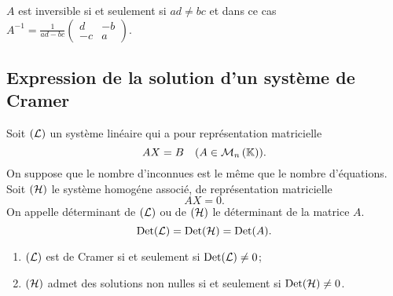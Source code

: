 \(A\) est inversible si et seulement si \(ad \neq bc\) et dans ce cas \(A^{-1} = \frac{1}{ad-bc} \begin{pmatrix} d & -b \\ -c & a \end{pmatrix}\).

\subsection{Expression de la solution d'un système de Cramer}

Soit \((\mathcal{L})\) un système linéaire qui a pour représentation matricielle
\begin{equation}
  AX=B \quad (A \in \mathcal{M}_{n}\left(\mathbb{K}\right)).
\end{equation}
On suppose que le nombre d'inconnues est le même que le nombre d'équations. Soit \((\mathcal{H})\) le système homogéne associé, de représentation matricielle
\begin{equation}
  AX=0.
\end{equation}
On appelle déterminant de \((\mathcal{L})\) ou de \((\mathcal{H})\) le déterminant de la matrice \(A\).
\begin{equation}
  \operatorname{Det}(\mathcal{L})=\operatorname{Det}(\mathcal{H})=\operatorname{Det}(A).
\end{equation}

\begin{prop}
  \begin{enumerate}
  \item \((\mathcal{L})\) est de Cramer si et seulement si \(\operatorname{Det}(\mathcal{L}) \neq 0\);
  \item \((\mathcal{H})\) admet des solutions non nulles si et seulement si \(\operatorname{Det}(\mathcal{H}) \neq 0\).
  \end{enumerate}
\end{prop}

